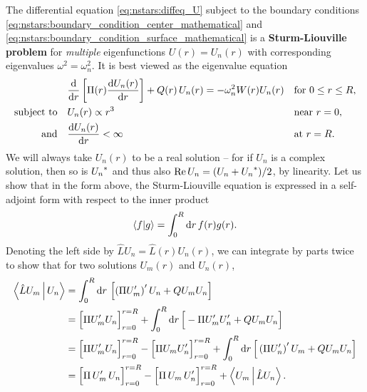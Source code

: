 The differential equation \eqref{eq:nstars:diffeq_U} subject to the boundary conditions \eqref{eq:nstars:boundary_condition_center_mathematical} and \eqref{eq:nstars:boundary_condition_surface_mathematical} is a \textbf{Sturm-Liouville problem} for \emph{multiple} eigenfunctions $U(r) = U_n(r)$ with corresponding eigenvalues $\omega^2 = \omega_n^2$.
It is best viewed as the eigenvalue equation
\begin{subequations}
\begin{align}
	&\odv*{ \left[ \Pi(r) \odv{U_n(r)}{r} \right] }{r} + Q(r) \, U_n(r) = -\omega_n^2 W(r) U_n(r) && \text{for } 0 \leq r \leq R , \label{eq:nstars:sturm_liouville} \\
	\text{subject to} \quad & U_n(r)          \propto r^3    && \text{near } r=0 , \label{eq:nstars:sturm_liouville_boundary_condition1} \\
	\text{and}        \quad & \odv{U_n(r)}{r} <       \infty && \text{at } r=R . \label{eq:nstars:sturm_liouville_boundary_condition2}
\end{align}%
\label{eq:nstars:sturm_liouville_problem}%
\end{subequations}
We will always take $U_n(r)$ to be a real solution -- for if $U_n$ is a complex solution, then so is ${U_n}^*$ and thus also $\operatorname{Re}{U_n} = (U_n + {U_n}^*)/2$, by linearity.
Let us show that in the form above, the Sturm-Liouville equation is expressed in a self-adjoint form with respect to the inner product
\begin{equation}
	\braket{f | g} = \int_0^R \mathop{}\!\mathrm{d} r \, f(r) g(r) .
\label{eq:nstars:function_inner_product}
\end{equation}
Denoting the left side by $\hat{L} U_n = \hat{L}(r) U_n(r)$, we can integrate by parts twice to show that for two solutions $U_m(r)$ and $U_n(r)$,
\begin{equation}
\begin{split}
	\Braket{\hat{L} U_m | U_n} &= \int_0^R \mathop{}\!\mathrm{d} r \, \left[ \left( \Pi U_m' \right)' U_n + Q U_m U_n \right] \\
	                           &= \Big[ \Pi U_m' U_n \Big]_{r=0}^{r=R} + \int_0^R \mathop{}\!\mathrm{d} r \, \Big[ - \Pi U_m' U_n' + Q U_m U_n \Big] \\
	                           &= \Big[ \Pi U_m' U_n \Big]_{r=0}^{r=R} - \Big[ \Pi U_m U_n' \Big]_{r=0}^{r=R} + \int_0^R \mathop{}\!\mathrm{d} r \, \Big[ \left( \Pi U_n' \right)' U_m + Q U_m U_n \Big] \\
	                           &= \Big[ \Pi \, U_m' \, U_n \Big]_{r=0}^{r=R} - \Big[ \Pi \, U_m \, U_n' \Big]_{r=0}^{r=R} + \Braket{U_m | \hat{L} U_n} . \\
\end{split}
\end{equation}
